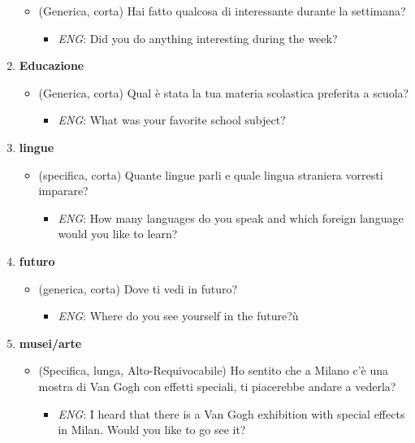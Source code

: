 \documentclass[
]{article}
\providecommand{\tightlist}{%
  \setlength{\itemsep}{0pt}\setlength{\parskip}{0pt}}
\newlength{\cslhangindent}
\newenvironment{CSLReferences}[2] %
 {\begin{list}{}{%
  \setlength{\itemindent}{0pt}
  \setlength{\leftmargin}{0pt}
  \setlength{\parsep}{0pt}
  \ifodd #1
   \setlength{\leftmargin}{\cslhangindent}
   \setlength{\itemindent}{-1\cslhangindent}
  \fi
  \setlength{\itemsep}{#2\baselineskip}}}
 {\end{list}}
\begin{document}
\begin{enumerate}
  \begin{itemize}
  \tightlist
  \item
    (Generica, corta) Hai fatto qualcosa di interessante durante la settimana?

    \begin{itemize}
    \tightlist
    \item
      \emph{ENG}: Did you do anything interesting during the week?
    \end{itemize}
  \end{itemize}
\item
  \textbf{Educazione}

  \begin{itemize}
  \tightlist
  \item
    (Generica, corta) Qual è stata la tua materia scolastica preferita a scuola?

    \begin{itemize}
    \tightlist
    \item
      \emph{ENG}: What was your favorite school subject?
    \end{itemize}
  \end{itemize}
\item
  \textbf{lingue}

  \begin{itemize}
  \tightlist
  \item
    (specifica, corta) Quante lingue parli e quale lingua straniera vorresti imparare?

    \begin{itemize}
    \tightlist
    \item
      \emph{ENG}: How many languages do you speak and which foreign language would you like to learn?
    \end{itemize}
  \end{itemize}
\item
  \textbf{futuro}

  \begin{itemize}
  \tightlist
  \item
    (generica, corta) Dove ti vedi in futuro?

    \begin{itemize}
    \tightlist
    \item
      \emph{ENG}: Where do you see yourself in the future?ù
    \end{itemize}
  \end{itemize}
\item
  \textbf{musei/arte}

  \begin{itemize}
  \tightlist
  \item
    (Specifica, lunga, Alto-Requivocabile) Ho sentito che a Milano c'è una mostra di Van Gogh con effetti speciali, ti piacerebbe andare a vederla?

    \begin{itemize}
    \tightlist
    \item
      \emph{ENG}: I heard that there is a Van Gogh exhibition with special effects in Milan. Would you like to go see it?
    \end{itemize}
  \end{itemize}
\end{enumerate}

\label{refs}
\begin{CSLReferences}{0}{1}
\end{CSLReferences}
\end{document}
